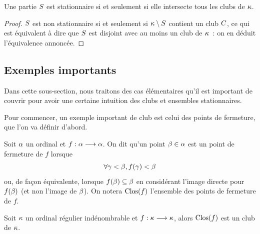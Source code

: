 \begin{proposition}
  Une partie $S$ est stationnaire si et seulement si elle intersecte tous
  les clubs de $\kappa$.
\end{proposition}

\begin{proof}
  $S$ est non stationnaire si et seulement si $\kappa\setminus S$
  contient un club $C$, ce qui est équivalent à dire que $S$ est
  disjoint avec au moins un club de $\kappa$~: on en déduit l'équivalence
  annoncée.
\end{proof}

\subsection{Exemples importants}

Dans cette sous-section, nous traitons des cas élémentaires qu'il est important
de couvrir pour avoir une certaine intuition des clubs et ensembles
stationnaires.

Pour commencer, un exemple important de club est celui des points de fermeture,
que l'on va définir d'abord.

\begin{definition}
  Soit $\alpha$ un ordinal et $f : \displaystyle \alpha \longrightarrow \alpha$. On dit qu'un
  point $\beta \in \alpha$ est un point de fermeture de $f$ lorsque
  \[\forall \gamma < \beta, f(\gamma) < \beta\]
  ou, de façon équivalente, lorsque $f(\beta) \subseteq \beta$ en considérant
  l'image directe pour $f(\beta)$ (et non l'image de $\beta$). On notera
  $\operatorname{Clos}(f)$ l'ensemble des points de fermeture de $f$.
\end{definition}

\begin{proposition}
  Soit $\kappa$ un ordinal régulier indénombrable et
  $f : \displaystyle \kappa \longrightarrow \kappa$, alors $\operatorname{Clos}(f)$ est un club de $\kappa$.
\end{proposition}

